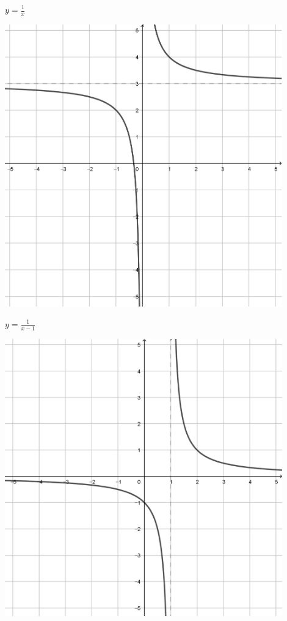 \documentclass[a4paper]{oblivoir}
\begin{document}
\clearpage
\begin{minipage}{0.45\textwidth}\centering
\(y=\frac1x\)
\par\bigskip\includegraphics[width=0.9\textwidth]{img/20-1}
\end{minipage}
\begin{minipage}{0.45\textwidth}\centering
\(y=\frac1{x-1}\)
\par\bigskip\includegraphics[width=0.9\textwidth]{img/20-2}
\end{minipage}\bigskip\bigskip\par
\end{document}
